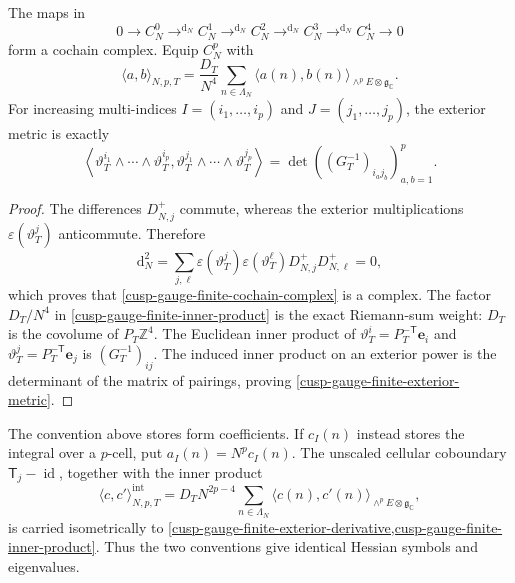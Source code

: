 \begin{lemma}
\label{cusp-gauge-finite-complex-metric}
The maps in
\begin{equation}
 0\longrightarrow C_N^0
 \mathrel{\mathop{\longrightarrow}^{\mathrm d_N}} C_N^1
 \mathrel{\mathop{\longrightarrow}^{\mathrm d_N}} C_N^2
 \mathrel{\mathop{\longrightarrow}^{\mathrm d_N}} C_N^3
 \mathrel{\mathop{\longrightarrow}^{\mathrm d_N}} C_N^4
 \longrightarrow0
 \label{cusp-gauge-finite-cochain-complex}
\end{equation}
form a cochain complex.  Equip \(C_N^p\) with
\begin{equation}
 \langle a,b\rangle_{N,p,T}
 =\frac{D_T}{N^4}\sum_{n\in\Lambda_N}
 \langle a(n),b(n)\rangle_{\wedge^pE\otimes\mathfrak g_{\mathbb C}}.
 \label{cusp-gauge-finite-inner-product}
\end{equation}
For increasing multi-indices
\(I=(i_1,\ldots,i_p)\) and \(J=(j_1,\ldots,j_p)\), the exterior metric is
exactly
\begin{equation}
 \left\langle
  \vartheta_T^{i_1}\wedge\cdots\wedge\vartheta_T^{i_p},
  \vartheta_T^{j_1}\wedge\cdots\wedge\vartheta_T^{j_p}
 \right\rangle
 =\det\left((G_T^{-1})_{i_a j_b}\right)_{a,b=1}^p.
 \label{cusp-gauge-finite-exterior-metric}
\end{equation}
\end{lemma}

\begin{proof}
The differences \(D_{N,j}^+\) commute, whereas the exterior
multiplications \(\varepsilon(\vartheta_T^j)\) anticommute.  Therefore
\[
 \mathrm d_N^2
 =\sum_{j,\ell}
 \varepsilon(\vartheta_T^j)\varepsilon(\vartheta_T^\ell)
 D_{N,j}^+D_{N,\ell}^+=0,
\]
which proves that \cref{cusp-gauge-finite-cochain-complex} is a complex.
The factor \(D_T/N^4\) in
\cref{cusp-gauge-finite-inner-product} is the exact Riemann-sum weight:
\(D_T\) is the covolume of \(P_T\mathbb Z^4\).  The Euclidean inner
product of \(\vartheta_T^i=P_T^{-\mathsf T}\mathbf e_i\) and
\(\vartheta_T^j=P_T^{-\mathsf T}\mathbf e_j\) is
\((G_T^{-1})_{ij}\).  The induced inner product on an exterior power is
the determinant of the matrix of pairings, proving
\cref{cusp-gauge-finite-exterior-metric}.
\end{proof}

\begin{remark}
\label{cusp-gauge-finite-integrated-normalization}
The convention above stores form coefficients.  If \(c_I(n)\) instead
stores the integral over a \(p\)-cell, put \(a_I(n)=N^pc_I(n)\).  The
unscaled cellular coboundary \(\mathsf T_j-\operatorname{id}\), together
with the inner product
\[
 \langle c,c'\rangle^{\mathrm{int}}_{N,p,T}
 =D_TN^{2p-4}\sum_{n\in\Lambda_N}
 \langle c(n),c'(n)\rangle_{\wedge^pE\otimes\mathfrak g_{\mathbb C}},
\]
is carried isometrically to
\cref{cusp-gauge-finite-exterior-derivative,cusp-gauge-finite-inner-product}.
Thus the two conventions give identical Hessian symbols and eigenvalues.
\end{remark}

